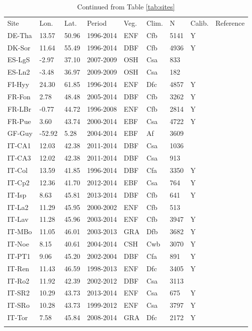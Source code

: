 \documentclass[gmd, manuscript]{copernicus}
\begin{document}
\begin{table}[t]
\caption{Continued from Table \ref{tab:sites}} 
\begin{tabular}{lllllllll}
  \tophline
  Site & Lon. & Lat. & Period & Veg. & Clim. & N & Calib. & Reference \\ 
  \middlehline  
  DE-Tha & 13.57 & 50.96 & 1996-2014 & ENF & Cfb & 5141 & Y & \citet{DE-Tha} \\ 
  DK-Sor & 11.64 & 55.49 & 1996-2014 & DBF & Cfb & 4936 & Y & \citet{DK-Sor} \\ 
  ES-LgS & -2.97 & 37.10 & 2007-2009 & OSH & Csa & 833 &  & \citet{ES-LgS} \\ 
  ES-Ln2 & -3.48 & 36.97 & 2009-2009 & OSH & Csa & 182 &  & \citet{ES-Ln2} \\ 
  FI-Hyy & 24.30 & 61.85 & 1996-2014 & ENF & Dfc & 4857 & Y & \citet{FI-Hyy} \\ 
  FR-Fon & 2.78 & 48.48 & 2005-2014 & DBF & Cfb & 3262 & Y & \citet{FR-Fon} \\ 
  FR-LBr & -0.77 & 44.72 & 1996-2008 & ENF & Cfb & 2814 & Y & \citet{FR-LBr} \\ 
  FR-Pue & 3.60 & 43.74 & 2000-2014 & EBF & Csa & 4722 & Y & \citet{FR-Pue} \\ 
  GF-Guy & -52.92 & 5.28 & 2004-2014 & EBF & Af & 3609 &  & \citet{GF-Guy} \\ 
  IT-CA1 & 12.03 & 42.38 & 2011-2014 & DBF & Csa & 1036 &  & \citet{IT-CA} \\ 
  IT-CA3 & 12.02 & 42.38 & 2011-2014 & DBF & Csa & 913 &  & \citet{IT-CA} \\ 
  IT-Col & 13.59 & 41.85 & 1996-2014 & DBF & Cfa & 3350 & Y & \citet{IT-Col} \\ 
  IT-Cp2 & 12.36 & 41.70 & 2012-2014 & EBF & Csa & 764 & Y & \citet{IT-Cp2} \\ 
  IT-Isp & 8.63 & 45.81 & 2013-2014 & DBF & Cfb & 641 & Y & \citet{IT-Isp} \\ 
  IT-La2 & 11.29 & 45.95 & 2000-2002 & ENF & Cfb & 513 &  & \citet{IT-La2} \\ 
  IT-Lav & 11.28 & 45.96 & 2003-2014 & ENF & Cfb & 3947 & Y & \citet{IT-Lav} \\ 
  IT-MBo & 11.05 & 46.01 & 2003-2013 & GRA & Dfb & 3682 & Y & \citet{IT-MBo} \\ 
  IT-Noe & 8.15 & 40.61 & 2004-2014 & CSH & Cwb & 3070 & Y & \citet{IT-Noe} \\ 
  IT-PT1 & 9.06 & 45.20 & 2002-2004 & DBF & Cfa & 891 & Y & \citet{IT-PT1} \\ 
  IT-Ren & 11.43 & 46.59 & 1998-2013 & ENF & Dfc & 3405 & Y & \citet{IT-Ren} \\ 
  IT-Ro2 & 11.92 & 42.39 & 2002-2012 & DBF & Csa & 3113 &  & \citet{IT-Ro2} \\ 
  IT-SR2 & 10.29 & 43.73 & 2013-2014 & ENF & Csa & 675 & Y & \citet{IT-SR2} \\ 
  IT-SRo & 10.28 & 43.73 & 1999-2012 & ENF & Csa & 3797 & Y & \citet{IT-SRo} \\ 
  IT-Tor & 7.58 & 45.84 & 2008-2014 & GRA & Dfc & 2172 & Y & \citet{IT-Tor} \\ 
    \bottomhline
\end{tabular}
\label{tab:sites2}
\end{table}
\clearpage
\end{document}
